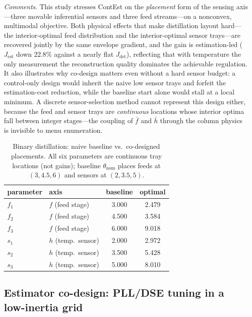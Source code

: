 \documentclass[twocolumn,amsthm]{autart}
\begin{document}
\emph{Comments.} This study stresses ContEst on the \emph{placement} form of the
sensing axis---three movable inferential sensors and three feed streams---on a
nonconvex, multimodal objective. Both physical effects that make distillation
layout hard---the interior-optimal feed distribution and the interior-optimal
sensor trays---are recovered jointly by the same envelope gradient, and the gain is
estimation-led ($J_{\mathrm{est}}$ down $22.8\%$ against a nearly flat
$J_{\mathrm{det}}$), reflecting that with temperature the only measurement the
reconstruction quality dominates the achievable regulation. It also illustrates why
co-design matters even without a hard sensor budget: a control-only design would
inherit the naive low sensor trays and forfeit the estimation-cost reduction, while
the baseline start alone would stall at a local minimum. A discrete
sensor-selection method cannot represent this design either, because the feed and
sensor trays are \emph{continuous} locations whose interior optima fall between
integer stages---the coupling of $\bar f$ and $\bar h$ through the column physics is
invisible to menu enumeration.

\begin{table}[t]
\centering
\caption{Binary distillation: naive baseline vs.\ co-designed placements. All six
parameters are continuous tray locations (not gains); baseline $\theta_{\mathrm{nom}}$
places feeds at $(3,4.5,6)$ and sensors at $(2,3.5,5)$.}
\label{tab:distill}
\begin{tabular}{llcc}
\hline
parameter & axis & baseline & optimal \\
\hline
$f_1$ & $f$ (feed stage)    & 3.000 & 2.479 \\
$f_2$ & $f$ (feed stage)    & 4.500 & 3.584 \\
$f_3$ & $f$ (feed stage)    & 6.000 & 9.018 \\
$s_1$ & $h$ (temp.\ sensor) & 2.000 & 2.972 \\
$s_2$ & $h$ (temp.\ sensor) & 3.500 & 5.428 \\
$s_3$ & $h$ (temp.\ sensor) & 5.000 & 8.010 \\
\hline
\end{tabular}
\end{table}

\subsection{Estimator co-design: PLL/DSE tuning in a low-inertia grid}
\label{sec:sim:pll}
\end{document}

